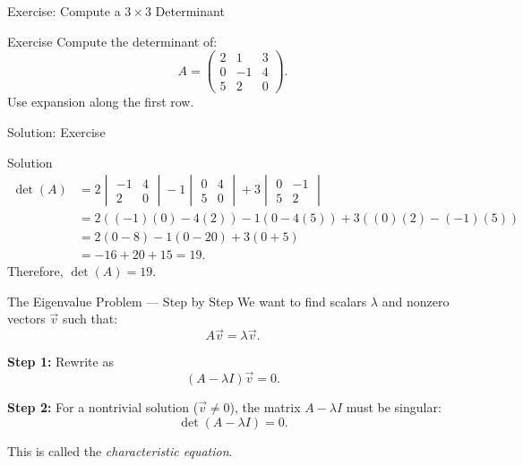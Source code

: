 \documentclass{beamer}
\begin{document}
	\begin{frame}{Exercise: Compute a \(3 \times 3\) Determinant}
		\begin{block}{Exercise}
		Compute the determinant of:
			\begin{equation}
			A =
			\begin{pmatrix}
			2 & 1 & 3 \\
			0 & -1 & 4 \\
			5 & 2 & 0
			\end{pmatrix}.
			\end{equation}
		Use expansion along the first row.
		\end{block}
	\end{frame}


	\begin{frame}{Solution: Exercise}
		\begin{block}{Solution}
			\begin{align}
			\det(A) &=
			2
			\begin{vmatrix}
			-1 & 4 \\ 2 & 0
			\end{vmatrix}
			- 1
			\begin{vmatrix}
			0 & 4 \\ 5 & 0
			\end{vmatrix}
			+ 3
			\begin{vmatrix}
			0 & -1 \\ 5 & 2
			\end{vmatrix} \\
			&= 2((-1)(0) -4(2)) -1(0 -4(5)) +3((0)(2) -(-1)(5)) \\
			&= 2(0-8) -1(0-20) +3(0+5) \\
			&= -16 +20 +15 = 19.
			\end{align}
		Therefore, \(\det(A) = 19.\)
		\end{block}
	\end{frame}

	\begin{frame}{The Eigenvalue Problem — Step by Step}
	We want to find scalars \(\lambda\) and nonzero vectors \(\vec{v}\) such that:
		\begin{equation}
		A \vec{v} = \lambda \vec{v}.
		\end{equation}

	\textbf{Step 1:} Rewrite as
		\begin{equation}
		(A - \lambda I)\vec{v} = 0.
		\end{equation}

	\textbf{Step 2:} For a nontrivial solution (\(\vec{v} \neq 0\)), the matrix \(A - \lambda I\) must be singular:
		\begin{equation}
		\det(A - \lambda I) = 0.
		\end{equation}

	This is called the \emph{characteristic equation}.
	\end{frame}
\end{document}
